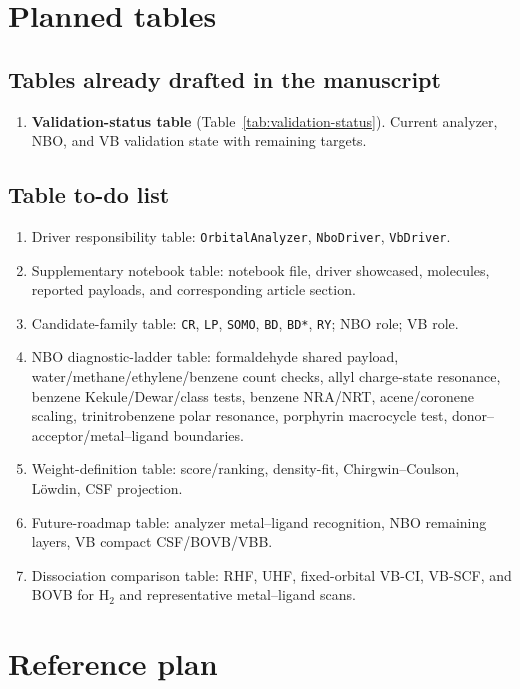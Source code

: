 \documentclass[11pt]{article}
\begin{document}
\section{Planned tables}

\subsection*{Tables already drafted in the manuscript}

\begin{enumerate}[leftmargin=*]
	\item \textbf{Validation-status table} (Table~\ref{tab:validation-status}). Current analyzer, NBO, and VB validation state with remaining targets.
\end{enumerate}

\subsection*{Table to-do list}

\begin{enumerate}[leftmargin=*]
	\item Driver responsibility table: \texttt{OrbitalAnalyzer}, \texttt{NboDriver}, \texttt{VbDriver}.
	\item Supplementary notebook table: notebook file, driver showcased, molecules, reported payloads, and corresponding article section.
	\item Candidate-family table: \texttt{CR}, \texttt{LP}, \texttt{SOMO}, \texttt{BD}, \texttt{BD*}, \texttt{RY}; NBO role; VB role.
	\item NBO diagnostic-ladder table: formaldehyde shared payload, water/methane/ethylene/benzene count checks, allyl charge-state resonance, benzene Kekule/Dewar/class tests, benzene NRA/NRT, acene/coronene scaling, trinitrobenzene polar resonance, porphyrin macrocycle test, donor--acceptor/metal--ligand boundaries.
	\item Weight-definition table: score/ranking, density-fit, Chirgwin--Coulson, L\"owdin, CSF projection.
	\item Future-roadmap table: analyzer metal--ligand recognition, NBO remaining layers, VB compact CSF/BOVB/VBB.
	\item Dissociation comparison table: RHF, UHF, fixed-orbital VB-CI, VB-SCF, and BOVB for H$_2$ and representative metal--ligand scans.
\end{enumerate}

\section{Reference plan}
\end{document}
